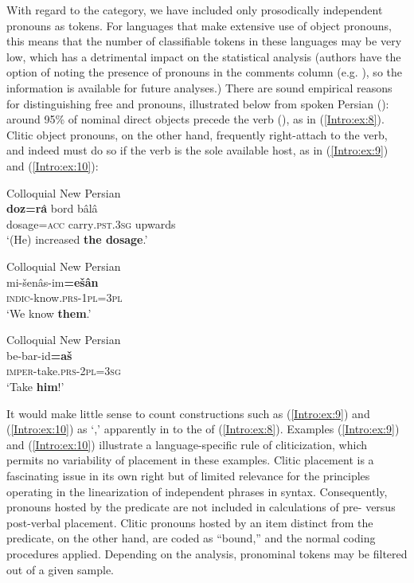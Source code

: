 \documentclass[output=paper,colorlinks,citecolor=brown,collectionchapter]{langscibook}
\begin{document}
With regard to the  category, we have included only prosodically independent pronouns as tokens. For languages that make extensive use of  object pronouns, this means that the number of classifiable  tokens in these languages may be very low, which has a detrimental impact on the statistical analysis (authors have the option of noting the presence of  pronouns in the comments column (e.g. \citealt{schreiber2021pontic}), so the information is available for future analyses.) There are sound empirical reasons for distinguishing free and  pronouns, illustrated below from spoken Persian (): around 95\% of nominal direct objects precede the verb (), as in (\ref{Intro:ex:8}). Clitic object pronouns, on the other hand, frequently right-attach to the verb, and indeed must do so if the verb is the sole available host, as in (\ref{Intro:ex:9}) and (\ref{Intro:ex:10}):

\ea\label{Intro:ex:8} 
Colloquial New Persian \citep[C, 0263]{Izadi2022Persian} \\
\gll \textbf{doz=ra}̂ bord bâlâ \\
dosage\textsc{=acc} carry\textsc{.pst.3sg} upwards \\
\glt `(He) increased \textbf{the dosage}.'
\z

\ea\label{Intro:ex:9} 
Colloquial New Persian \citep[V, 2375]{Izadi2022Persian} \\
\gll mi-šenâs-im\textbf{=ešân} \\
\textsc{indic-}know\textsc{.prs-1pl=3pl} \\
\glt `We know \textbf{them}.'
\z

\ea\label{Intro:ex:10} 
Colloquial New Persian \citep[oh\_f\_accident\_0166]{HaigRasekhMahand2022HamBam}  \\
\gll be-bar-id\textbf{=aš} \\
\textsc{imper-}take\textsc{.prs-2pl=3sg} \\
\glt `Take \textbf{him}!'
\z

It would make little sense to count constructions such as (\ref{Intro:ex:9}) and (\ref{Intro:ex:10}) as `,' apparently in  to the  of (\ref{Intro:ex:8}). Examples (\ref{Intro:ex:9}) and (\ref{Intro:ex:10}) illustrate a language-specific rule of cliticization, which permits no variability of  placement in these examples. Clitic placement is a fascinating issue in its own right but of limited relevance for the principles operating in the linearization of independent phrases in syntax. Consequently,  pronouns hosted by the predicate are not included in calculations of pre- versus post-verbal  placement.  Clitic pronouns hosted by an item distinct from the predicate, on the other hand, are coded as ``bound,'' and the normal coding procedures applied. Depending on the analysis, pronominal tokens may be filtered out of a given sample.
\end{document}
